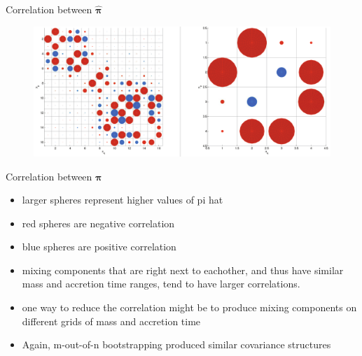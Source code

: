 \documentclass{beamer}
\newcommand{\vect}[1]{\boldsymbol{\mathbf{#1}}}
\newcommand{\vp}{\vect{\pi}}
\newcommand{\vph}{\hat{\vect{\pi}}}
\begin{document}
\begin{frame}{Correlation between $\vph$}	
	
	\begin{figure}
			\begin{center}
				\includegraphics[scale=0.17]{correl.pdf}
			\end{center}
	\end{figure}	
	
\end{frame}
\begin{frame}[shrink]{Correlation between $\vp$}
	
	\begin{itemize}
		\item larger spheres represent higher values of pi hat
		\item red spheres are negative correlation
		\item blue spheres are positive correlation
		\item mixing components that are right next to eachother, and thus have similar mass and accretion time ranges, tend to have larger correlations.
		\item one way to reduce the correlation might be to produce mixing components on different grids of mass and accretion time
		
		\item Again, m-out-of-n bootstrapping produced similar covariance structures
		
	\end{itemize}
	
\end{frame}
\end{document}
